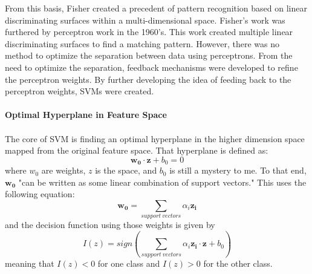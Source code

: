 

			From this basis, Fisher created a precedent of pattern recognition based on linear discriminating surfaces within a multi-dimensional space.  Fisher's work was furthered by perceptron work in the 1960's.  This work created multiple linear discriminating surfaces to find a matching pattern.  However, there was no method to optimize the separation between data using perceptrons.  From the need to optimize the separation, feedback mechanisms were developed to refine the perceptron weights. By further developing the idea of feeding back to the perceptron weights, SVMs were created.



			\paragraph{Optimal Hyperplane in Feature Space}
			\paragraph{} The core of SVM is finding an optimal hyperplane in the higher dimension space mapped from the original feature space.  That hyperplane is defined as:
			\begin{equation}\label{oh1} \mathbf{w_0} \cdot \mathbf{z} + b_0 = 0\end{equation} where $w_0$ are weights, $z$ is the space, and $b_0$ is still a mystery to me.
			To that end, $\mathbf{w_0}$ "can be written as some linear combination of support vectors."  This uses the following equation:
			\begin{equation}\mathbf{w_0} = \sum_{support\ vectors} \alpha_i \mathbf{z_i}\end{equation} and the decision function using those weights is given by
			\begin{equation}I(z) = sign\left(\sum_{support\ vectors} \alpha_i \mathbf{z_i} \cdot \mathbf{z} + b_0\right)\end{equation}
			meaning that $I(z) < 0$ for one class and $I(z) > 0$ for the other class.
